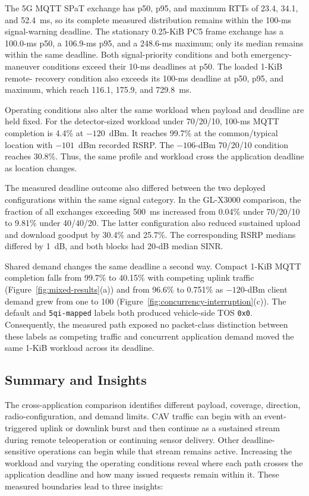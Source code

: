 The 5G MQTT SPaT exchange has p50, p95, and maximum RTTs of 23.4, 34.1, and
52.4~ms, so its complete measured distribution remains within the 100-ms
signal-warning deadline. The stationary 0.25-KiB PC5 frame exchange has a 100.0-ms
p50, a 106.9-ms p95, and a 248.6-ms maximum; only its median remains within the
same deadline. Both signal-priority conditions and both emergency-maneuver
conditions exceed their 10-ms deadlines at p50. The loaded 1-KiB remote-
recovery condition also exceeds its 100-ms deadline at p50, p95, and maximum,
which reach 116.1, 175.9, and 729.8~ms.

Operating conditions also alter the same workload when payload and deadline
are held fixed. For the detector-sized workload under 70/20/10,
100-ms MQTT completion is 4.4\% at $-120$~dBm. It reaches 99.7\% at the
common/typical location with $-101$~dBm recorded RSRP. The $-106$-dBm
70/20/10 condition reaches 30.8\%. Thus, the same profile and workload cross
the application deadline as location changes.

The measured deadline outcome also differed between the two deployed
configurations within the same signal category. In the GL-X3000 comparison, the fraction of
all exchanges exceeding 500~ms increased from 0.04\% under 70/20/10 to 9.81\%
under 40/40/20. The latter configuration also reduced sustained upload and
download goodput by 30.4\% and 25.7\%. The corresponding RSRP medians differed
by 1~dB, and both blocks had 20-dB median SINR.

Shared demand changes the same deadline a second way. Compact 1-KiB MQTT completion falls
from 99.7\% to 40.15\% with competing uplink traffic
(Figure~\ref{fig:mixed-results}(a)) and from 96.6\% to 0.751\% as $-120$-dBm
client demand grew from one to 100
(Figure~\ref{fig:concurrency-interruption}(c)). The default and
\texttt{5qi-mapped} labels both produced vehicle-side TOS \texttt{0x0}.
Consequently, the measured path exposed no packet-class distinction between
these labels as competing traffic and concurrent application demand moved the
same 1-KiB workload across its deadline.

\FloatBarrier
\subsection{Summary and Insights}
\label{sec:results-insights}

The cross-application comparison identifies different payload, coverage,
direction, radio-configuration, and demand limits. CAV traffic can begin with
an event-triggered uplink or downlink burst and then continue as a sustained
stream during remote teleoperation or continuing sensor delivery. Other
deadline-sensitive operations can begin while that stream remains active.
Increasing the workload and varying the operating conditions reveal where each
path crosses the application deadline and how many issued requests remain
within it. These measured boundaries lead to three insights:

